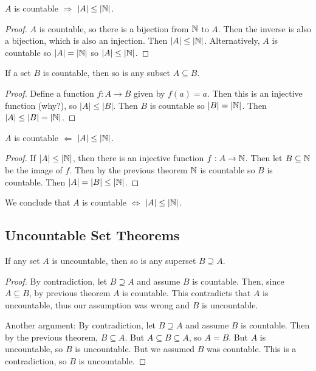 \documentclass[main.tex]{subfiles}
\begin{document}
\begin{thm}
	\(A\) is countable \(\Rightarrow\) \(|A| \leq |\mathbb{N}|\).
\end{thm}

\begin{proof}
	\(A\) is countable, so there is a bijection from \(\mathbb{N}\) to \(A\). Then the inverse is also a bijection, which is also an injection. Then \(|A| \leq |\mathbb{N}|\). Alternatively, \(A\) is countable so \(|A| = |\mathbb{N}|\) so \(|A| \leq |\mathbb{N}|\).
\end{proof}

\begin{thm}
	If a set \(B\) is countable, then so is any subset \(A \subseteq B\).
\end{thm}

\begin{proof}
	Define a function \(f : A \rightarrow B\) given by \(f(a) = a\). Then this is an injective function (why?), so \(|A| \leq |B|\). Then \(B\) is countable so \(|B| = |\mathbb{N}|\). Then \(|A| \leq |B| = |\mathbb{N}|\).
\end{proof}

\begin{thm}
	\(A\) is countable \(\Leftarrow\) \(|A| \leq |\mathbb{N}|\).
\end{thm}

\begin{proof}
	If \(|A| \leq |\mathbb{N}|\), then there is an injective function \(f : A \rightarrow \mathbb{N}\). Then let \(B \subseteq \mathbb{N}\) be the image of \(f\). Then by the previous theorem \(\mathbb{N}\) is countable so \(B\) is countable. Then \(|A| = |B| \leq |\mathbb{N}|\).
\end{proof}

\begin{rem}
	We conclude that \(A\) is countable \(\Leftrightarrow\) \(|A| \leq |\mathbb{N}|\).
\end{rem}

\subsection{Uncountable Set Theorems}

\begin{thm}
	If any set \(A\) is uncountable, then so is any superset \(B \supseteq A\).
\end{thm}

\begin{proof}
	By contradiction, let \(B \supseteq A\) and assume \(B\) is countable.
	Then, since \(A \subseteq B\), by previous theorem \(A\) is countable.
	This contradicts that \(A\) is uncountable, thus our assumption was wrong and \(B\) is uncountable.
	
	\bigskip
	Another argument:
	By contradiction, let \(B \supseteq A\) and assume \(B\) is countable. Then by the previous theorem, \(B \subseteq A\). But \(A \subseteq B \subseteq A\), so \(A = B\). But \(A\) is uncountable, so \(B\) is uncountable. But we assumed \(B\) was countable. This is a contradiction, so \(B\) is uncountable.
\end{proof}
\end{document}
